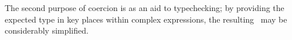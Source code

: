 The second purpose of coercion is as an aid to typechecking; by
providing the expected type in key places within complex expressions,
the resulting \tccs\ may be considerably simplified.




